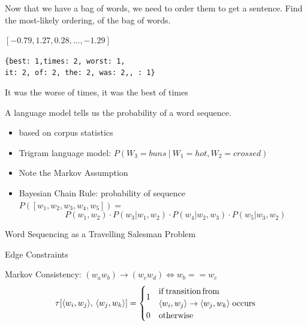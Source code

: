 \documentclass[]{beamer}
\newcommand{\fullwidthtikz}[1]{\resizebox{0.9\textwidth}{!}{
		\centering
		}}
\newcommand{\displayunskip}{\vspace{0pt}}
\begin{document}

\begin{frame}{Now that we have a bag of words, we need to order them to get a sentence.}
	\vfill
		Find the most-likely ordering, of the bag of words.
	\vfill
	\begin{description}
		\item<1->[Input Vector]  $[−0.79, 1.27, 0.28, ..., −1.29]$
		\item<1->[Bag of Words]  \texttt{\{best: 1,times: 2, worst: 1,\\ it: 2, of: 2, the: 2, was: 2,, : 1\}}
		\vspace{1em}
		\item<1->[Output Sentence] It was the worse of times, it was the best of times
	\end{description}
	\vfill
\end{frame}

\begin{frame}{A language model tells us the probability of a word sequence.}
	\begin{itemize}
		\item based on corpus statistics
		\item Trigram language model: $P(W_3=buns\:|\:W_1=hot, W_2=crossed)$
		\item Note the Markov Assumption
		\pause
		\item Bayesian Chain Rule: probability of sequence \\$P([w_1,w_2,w_3,w_4,w_5])=$
		$$\qquad \quad P(w_1,w_2)\cdot P(w_3|w_1,w_2)\cdot P(w_4|w_2,w_3) \cdot P(w_5|w_3,w_2)$$
		
	\end{itemize}
	
\end{frame}

\begin{frame}{Word Sequencing as a Travelling Salesman Problem}
	\vspace{-2em}
	\fullwidthtikz{../figs/ordergraphpaper}
	 
\end{frame}

\begin{frame}{Edge Constraints}
	\vspace{-2em} 
	\fullwidthtikz{../figs/ordergraphpaper}
	
	\alert{Markov Consistency:} $(w_aw_b)\to (w_cw_d) \iff w_b==w_c$
	\displayunskip
	\begin{gather*}
	\tau[\langle w_{i},w_{j}\rangle,\,\langle w_{j},w_{k}\rangle] = %
	\begin{cases}
	\multirow{2}{*}{1} & \mathrm{if\,transition\,from} \\
	& \langle w_{i},w_{j}\rangle \to \langle w_{j},w_{k}\rangle
	\;\mathrm{ occurs} \\
	0  & \mathrm{otherwise}
	\end{cases}
	\end{gather*}
\end{frame}
\end{document}
